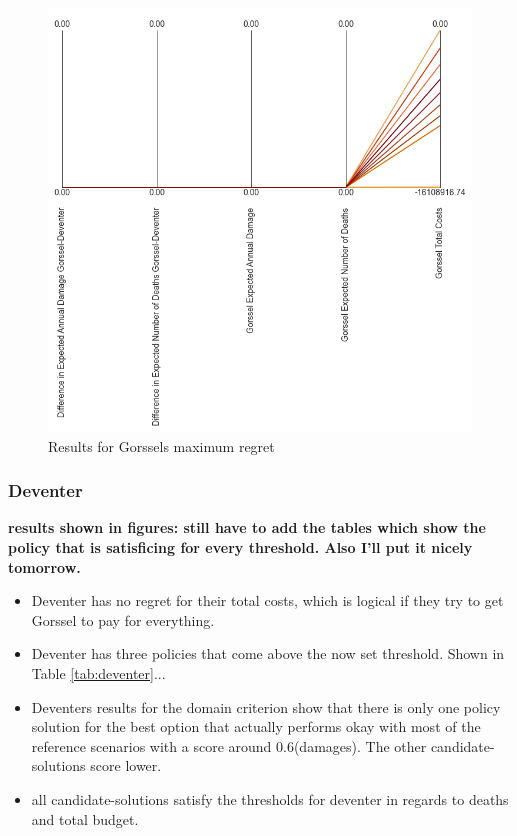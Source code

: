 \begin{figure}[H]
\begin{minipage}[b]{0.4\textwidth}
    \includegraphics[width=1.15\textwidth]{report/figures/results/regret_figure_Gorssel.png}
    \caption{Results for Gorssels maximum regret}
    \label{fig:regret_gorssel}
  \end{minipage}
\end{figure}




\subsubsection{Deventer}
\textbf{results shown in figures: still have to add the tables which show the policy that is satisficing for every threshold. Also I'll put it nicely tomorrow. }
\begin{itemize}
    \item Deventer has no regret for their total costs, which is logical if they try to get Gorssel to pay for everything.
    \item Deventer has three policies that come above the now set threshold. Shown in Table \ref{tab:deventer}...
    \item Deventers results for the domain criterion show that there is only one policy solution for the best option that actually performs okay with most of the reference scenarios with a score around 0.6(damages). The other candidate-solutions score lower. 
    \item all candidate-solutions satisfy the thresholds for deventer in regards to deaths and total budget.
\end{itemize}

